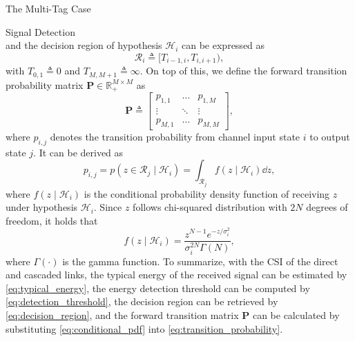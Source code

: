 \documentclass[journal]{IEEEtran}
\begin{document}
\begin{section}{The Multi-Tag Case}
\begin{subsection}{Signal Detection}
\begin{equation}
				\label{eq:detection_threshold}
			\end{equation}
			and the decision region of hypothesis $\mathcal{H}_i$ can be expressed as
			\begin{equation}
				\mathcal{R}_i \triangleq [T_{i-1, i}, T_{i, i+1}),
				\label{eq:decision_region}
			\end{equation}
			with $T_{0, 1} \triangleq 0$ and $T_{M, M+1} \triangleq \infty$. On top of this, we define the forward transition probability matrix $\boldsymbol{P} \in \mathbb{R}_{+}^{M \times M}$ as
			\begin{equation}
				\boldsymbol{P} \triangleq
				\begin{bmatrix}
					p_{1, 1} & \ldots & p_{1, M} \\
					\vdots & \ddots & \vdots \\
					p_{M, 1} & \ldots & p_{M, M}
				\end{bmatrix},
			\end{equation}
			where $p_{i, j}$ denotes the transition probability from channel input state $i$ to output state $j$. It can be derived as
			\begin{equation}
				p_{i, j} = p(z \in \mathcal{R}_j \mid \mathcal{H}_i) = \int_{\mathcal{R}_j} f(z \mid \mathcal{H}_i) \dd z,
				\label{eq:transition_probability}
			\end{equation}
			where $f(z \mid \mathcal{H}_i)$ is the conditional probability density function of receiving $z$ under hypothesis $\mathcal{H}_i$. Since $z$ follows chi-squared distribution with $2N$ degrees of freedom, it holds that
			\begin{equation}
				f(z \mid \mathcal{H}_i) = \frac{z^{N-1} e^{-z/\sigma_i^2}}{\sigma_i^{2N} \Gamma(N)},
				\label{eq:conditional_pdf}
			\end{equation}
			where $\Gamma(\cdot)$ is the gamma function. To summarize, with the CSI of the direct and cascaded links, the typical energy of the received signal can be estimated by \eqref{eq:typical_energy}, the energy detection threshold can be computed by \eqref{eq:detection_threshold}, the decision region can be retrieved by \eqref{eq:decision_region}, and the forward transition matrix $\boldsymbol{P}$ can be calculated by substituting \eqref{eq:conditional_pdf} into \eqref{eq:transition_probability}.


\end{subsection}
\end{section}
\end{document}
